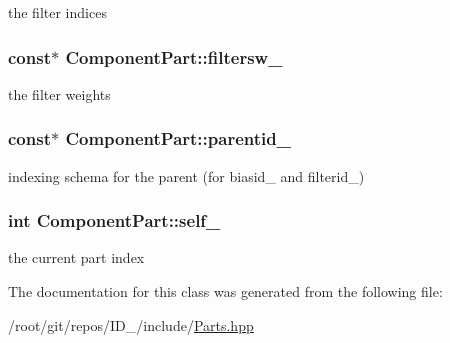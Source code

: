 the filter indices 

\hypertarget{classComponentPart_a301c8633b1e8db3f30436c0ba0fc140d}{
\subsubsection[{filtersw\-\_\-}]{ const$\ast$ {\bf \-Component\-Part\-::filtersw\-\_\-}}}\label{classComponentPart_a301c8633b1e8db3f30436c0ba0fc140d}


the filter weights 

\hypertarget{classComponentPart_a3c75a843f04e4b3d56e4461f8ef803fa}{
\subsubsection[{parentid\-\_\-}]{ const$\ast$ {\bf \-Component\-Part\-::parentid\-\_\-}}}\label{classComponentPart_a3c75a843f04e4b3d56e4461f8ef803fa}


indexing schema for the parent (for biasid\-\_\- and filterid\-\_\-) 

\hypertarget{classComponentPart_a814391cfc1e60223f270d06e3bf2f8b6}{
\subsubsection[{self\-\_\-}]{\setlength{\rightskip}{0pt plus 5cm}int {\bf \-Component\-Part\-::self\-\_\-}}}\label{classComponentPart_a814391cfc1e60223f270d06e3bf2f8b6}


the current part index 



\-The documentation for this class was generated from the following file\-:\begin{DoxyCompactItemize}
\item 
/root/git/repos/\-I\-D\-\_/include/\hyperlink{Parts_8hpp}{\-Parts.\-hpp}\end{DoxyCompactItemize}

